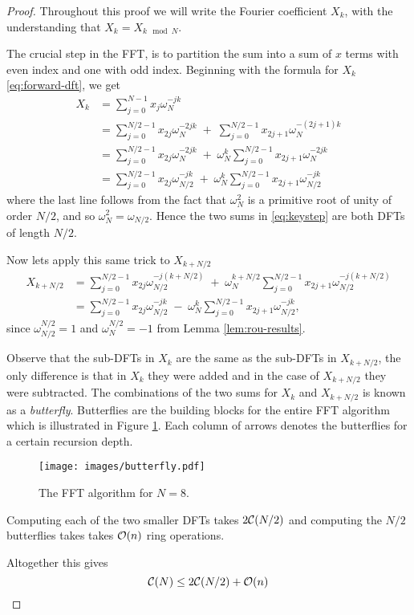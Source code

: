 \begin{proof}
    Throughout this proof we will write the Fourier coefficient $X_k$, with the understanding that $X_{k} = X_{k \mod N}$.

    The crucial step in the FFT, is to partition the sum into a sum of $x$ terms with even index and one with odd index. Beginning with the formula for $X_k$ \eqref{eq:forward-dft}, we get
    \begin{align}
        X_k
        &= \sum^{N-1}_{j=0}x_j\omega_N^{\minus jk} \nonumber\\
        &= \sum^{N/2-1}_{j=0}x_{2j}\omega_N^{\minus 2jk} \;+\; \sum^{N/2-1}_{j=0}x_{2j+1} \omega_N^{\minus (2j+1)k} \nonumber\\
        &= \sum^{N/2-1}_{j=0}x_{2j}\omega_N^{\minus 2jk} \;+\; \omega_N^k \sum^{N/2-1}_{j=0}x_{2j+1}\omega_N^{\minus 2jk}\\
        &= \sum^{N/2-1}_{j=0}x_{2j}\omega_{N/2}^{\minus jk} \;+\; \omega_N^k \sum^{N/2-1}_{j=0}x_{2j+1}\omega_{N/2}^{\minus jk} \label{eq:keystep}
    \end{align}
    where the last line follows from the fact that $\omega_N^2$ is a primitive root of unity of order $N/2$, and so $\omega_N^2 = \omega_{N/2}$. Hence the two sums in \eqref{eq:keystep} are both DFTs of length $N/2$. 

    Now lets apply this same trick to $X_{k + N/2}$
    \begin{align*}
        X_{k + N/2}
    &= \sum^{N/2-1}_{j=0}x_{2j}\omega_{N/2}^{\minus j(k + N/2)} \;+\; \omega_N^{k+ N/2} \sum^{N/2-1}_{j=0}x_{2j+1}\omega_{N/2}^{\minus j(k + N/2)}\\
    &= \sum^{N/2-1}_{j=0}x_{2j}\omega_{N/2}^{\minus jk} \;-\; \omega_N^k \sum^{N/2-1}_{j=0}x_{2j+1}\omega_{N/2}^{\minus jk},
    \end{align*}
    since $\omega_{N/2}^{N/2} = 1$ and $\omega_N^{N/2} = -1$ from Lemma \ref{lem:rou-results}.

    Observe that the sub-DFTs in $X_k$ are the same as the sub-DFTs in $X_{k + N/2}$, the only difference is that in $X_k$ they were added and in the case of $X_{k + N/2}$ they were subtracted. The combinations of the two sums for $X_k$ and $X_{k + N/2}$ is known as a \textit{butterfly}. Butterflies are the building blocks for the entire FFT algorithm which is illustrated in Figure \ref{fig:butterflies}. Each column of arrows denotes the butterflies for a certain recursion depth.
    
    \begin{figure}[t]
        \centering
        \texttt{[image: images/butterfly.pdf]}
        \caption{The FFT algorithm for $N = 8$.}
        \label{fig:butterflies}
    \end{figure}

    Computing each of the two smaller DFTs takes $2\mathcal C(N/2)$ and computing the $N/2$ butterflies takes takes $\mathcal O(n)$ ring operations.

    Altogether this gives
    \[
        \mathcal C(N) \le 2 \mathcal C(N/2) + \mathcal O(n)
    \]
\end{proof}

